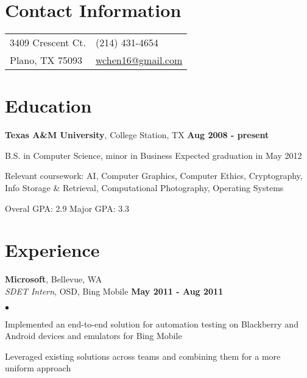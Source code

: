 \documentclass[margin,line]{res}
\newenvironment{list1}{
  \begin{list}{\ding{113}}{%
      \setlength{\itemsep}{0in}
      \setlength{\parsep}{0in} \setlength{\parskip}{0in}
      \setlength{\topsep}{0in} \setlength{\partopsep}{0in} 
      \setlength{\leftmargin}{0.17in}}}{\end{list}}
\newenvironment{list2}{
  \begin{list}{$\bullet$}{%
      \setlength{\itemsep}{0in}
      \setlength{\parsep}{0in} \setlength{\parskip}{0in}
      \setlength{\topsep}{0in} \setlength{\partopsep}{0in} 
      \setlength{\leftmargin}{0.18in}}}{\end{list}}
\begin{document}

\begin{resume}
\section{\sc Contact Information}
\vspace{.05in}
\begin{tabular}{@{}p{3in}p{4in}}
3409 Crescent Ct.          & (214) 431-4654 \\
Plano, TX 75093            & \href{mailto:wchen16@gmail.com}{wchen16@gmail.com} \\
\end{tabular}

%
%
\section{\sc Education}
{\bf Texas A\&M University}, College Station, TX \hfill {\bf Aug 2008 - present} \\
\vspace*{-3mm}
\begin{list1}
\item[] \hspace*{-5mm} B.S. in Computer Science, minor in Business \hfill Expected graduation in May 2012 
\item[] \hspace*{-5mm} Relevant coursework: AI, Computer Graphics, Computer Ethics, Cryptography, 
  Info Storage \& Retrieval, Computational Photography, Operating Systems
\item[] \hspace*{-5mm} Overal GPA: 2.9 \hspace{5mm} Major GPA: 3.3
\end{list1}


%
%
\section{\sc Experience}
{\bf Microsoft}, Bellevue, WA \\
{\em SDET Intern}, OSD, Bing Mobile \hfill {\bf May 2011 - Aug 2011} \\
\vspace{-3mm}
\begin{list2}
\item Implemented an end-to-end solution for automation testing on Blackberry and Android devices 
  and emulators for Bing Mobile
\item Leveraged existing solutions across teams and combining them for a more uniform approach
\end{list2}


\end{resume}
\end{document}
